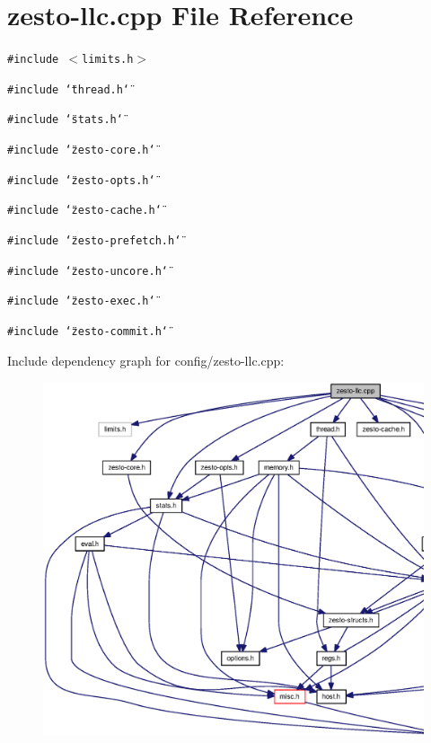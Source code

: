 \section{zesto-llc.cpp File Reference}
\label{config_2zesto-llc_8cpp}
{\tt \#include $<$limits.h$>$}\par
{\tt \#include \char`\"{}thread.h\char`\"{}}\par
{\tt \#include \char`\"{}stats.h\char`\"{}}\par
{\tt \#include \char`\"{}zesto-core.h\char`\"{}}\par
{\tt \#include \char`\"{}zesto-opts.h\char`\"{}}\par
{\tt \#include \char`\"{}zesto-cache.h\char`\"{}}\par
{\tt \#include \char`\"{}zesto-prefetch.h\char`\"{}}\par
{\tt \#include \char`\"{}zesto-uncore.h\char`\"{}}\par
{\tt \#include \char`\"{}zesto-exec.h\char`\"{}}\par
{\tt \#include \char`\"{}zesto-commit.h\char`\"{}}\par


Include dependency graph for config/zesto-llc.cpp:\nopagebreak
\begin{figure}[H]
\begin{center}
\leavevmode
\includegraphics[width=420pt]{config_2zesto-llc_8cpp__incl}
\end{center}
\end{figure}
